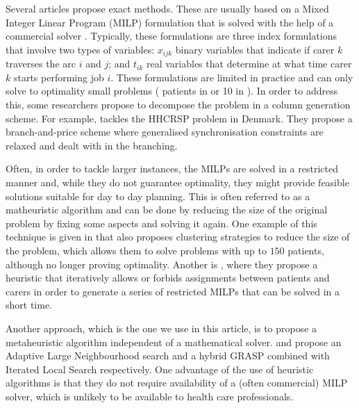 \documentclass[a4paper,11pt]{elsarticle}
\begin{document}
Several articles propose exact methods. These are usually based on a Mixed Integer Linear Program (MILP) formulation that is solved with the help of a commercial solver \citep{Bredstrom2008,Bachouch2011, Mankowska2014, AitHaddadene2016}. Typically, these formulations are three index formulations that involve two types of variables: $x_{ijk}$ binary variables that indicate if carer $k$ traverses the arc $i$ and $j$; and $t_{ik}$ real variables that determine at what time carer $k$ starts performing job $i$. These formulations are limited in practice and can only solve to optimality small problems ( patients in \cite{AitHaddadene2016} or 10 in \cite{Mankowska2014}). In order to address this, some researchers propose to decompose the problem in a column generation scheme. For example, \cite{Rasmussen2012} tackles the HHCRSP problem in Denmark. They propose a branch-and-price scheme where generalised synchronisation constraints are relaxed and dealt with in the branching. %

Often, in order to tackle larger instances, the MILPs are solved in a restricted manner and, while they do not guarantee optimality, they might provide feasible solutions suitable for day to day planning. This is often referred to as a matheuristic algorithm and can be done by reducing the size of the original problem by fixing some aspects and solving it again. One example of this technique is given in \cite{Rasmussen2012} that also proposes clustering strategies to reduce the size of the problem, which allows them to solve problems with up to $150$ patients, although no longer proving optimality. Another is \cite{Bredstrom2008}, where they propose a heuristic that iteratively allows or forbids assignments between patients and carers in order to generate a series of restricted MILPs that can be solved in a short time.

Another approach, which is the one we use in this article, is to propose a metaheuristic algorithm independent of a mathematical solver. \cite{Mankowska2014} and \cite{AitHaddadene2016} propose an Adaptive Large Neighbourhood search and a hybrid GRASP combined with Iterated Local Search respectively. One advantage of the use of heuristic algorithms is that they do not require availability of a (often commercial) MILP solver, which is unlikely to be available to health care professionals. 
\end{document}
